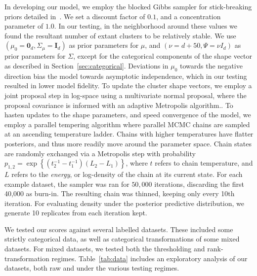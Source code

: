 In developing our model, we employ the blocked Gibbs sampler for stick-breaking
    priors detailed in~\cite{ishwaran2001}.  We set a discount factor of $0.1$, 
    and a concentration parameter of $1.0$.  In our testing, in the neighborhood
    around these values we found the resultant number of extant clusters to be 
    relatively stable.  We use $(\mu_0 = \bm{0}_d,\Sigma_{\mu} = \bm{I}_d)$ as 
    prior parameters for $\mu$, and $(\nu = d + 50,\Psi = \nu I_d)$ as prior 
    parameters for $\Sigma$, except for the categorical components of the shape 
    vector as described in Section~\ref{sec:categorical}.  Deviations in $\mu_0$ 
    towards the negative direction bias the model towards asymptotic 
    independence, which in our testing resulted in lower model fidelity.
    To update the cluster shape vectors, we employ a joint proposal step in 
    log-space using a multivariate normal proposal, where the proposal 
    covariance is informed with an adaptive Metropolis 
    algorithm..  To hasten updates to the shape
    parameters, and speed convergence of the model, we employ a parallel
    tempering algorithm where parallel MCMC chains are sampled at an ascending
    temperature ladder.  Chains with higher temperatures have flatter 
    posteriors, and thus more readily move around the parameter space.  
    Chain states are randomly exchanged via a Metropolis step with probability
    $p_{1,2} = \exp\left\lbrace (t_2^{-1} - t_1^{-1})(L_2-L_1)\right\rbrace$,
    where $t$ refers to chain temperature, and $L$ refers to the
    \emph{energy}, or log-density of the chain at its current state.  
    For each example dataset, the sampler was ran for $50,000$ iterations,
    discarding the first 40,000 as burn-in.  The resulting chain was thinned,
    keeping only every 10th iteration.  For evaluating density under the 
    posterior predictive distribution, we generate 10 replicates from each
    iteration kept.

We tested our scores against several labelled datasets.  These included some 
    strictly categorical data, as well as categorical transformations of some 
    mixed datasets.  For mixed datasets, we tested both the thresholding and 
    rank-transformation regimes. Table~\ref{tab:data} includes an exploratory 
    analysis of our datasets, both raw and under the various testing regimes.

